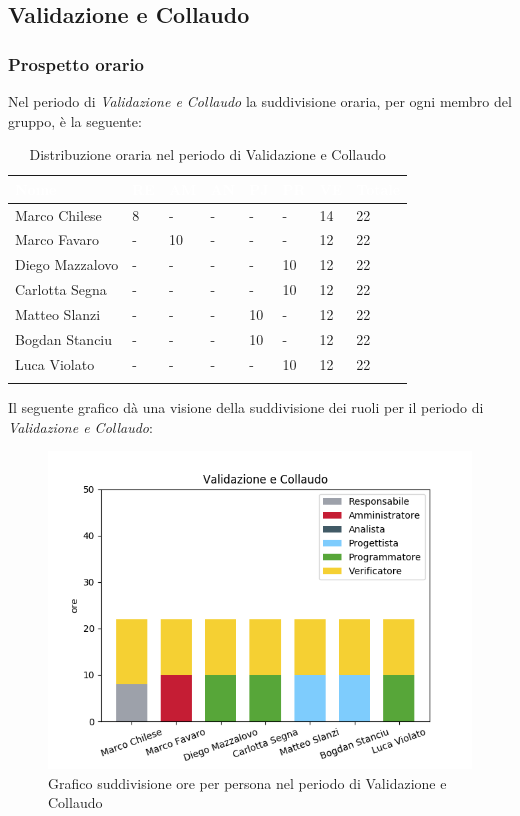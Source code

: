 \newpage
\subsection{Validazione e Collaudo}
\label{PVC}
\subsubsection{Prospetto orario}
Nel periodo di \textit{Validazione e Collaudo} la suddivisione oraria, per ogni membro del gruppo, è la seguente:

\begin{longtable}{|C{.30\textwidth}|C{.06\textwidth}|C{.06\textwidth}|C{.06\textwidth} | C{.06\textwidth}| C{.06\textwidth} | C{.06\textwidth} | C{.10\textwidth} |}
	\hline
{}	\textbf{\textcolor{white}{Nome}} & \textbf{\textcolor{white}{RE}} & \textbf{\textcolor{white}{AM}} & \textbf{\textcolor{white}{AN}} & \textbf{\textcolor{white}{PJ}} & \textbf{\textcolor{white}{PR}} & \textbf{\textcolor{white}{VE}} & \textbf{\textcolor{white}{Totale}}\\
	\hline 
	Marco Chilese & 8 & - & - & - & - & 14 & 22 \\
	\hline
	Marco Favaro &  - & 10 & - & - & - & 12 & 22 \\
	\hline
	Diego Mazzalovo & - & - & - & - & 10 & 12 & 22 \\
	\hline
	Carlotta Segna & - & - & - & - & 10 & 12 & 22 \\
	\hline
	Matteo Slanzi & - & - & - & 10 & - & 12 & 22 \\
	\hline
	Bogdan Stanciu & - & - & - & 10 & - & 12 & 22 \\
	\hline
	Luca Violato & - & - & - & - & 10 & 12 & 22 \\   
	\hline
	
	
	\caption{Distribuzione oraria nel periodo di Validazione e Collaudo}
	\label{Distribuzione oraria vc}
\end{longtable}

Il seguente grafico dà una visione della suddivisione dei ruoli per il periodo di \textit{Validazione e Collaudo}:

\begin{figure}[H]
	\centering
	\includegraphics[width=0.8\linewidth]{./images/fig_vc.png}
	\caption{Grafico suddivisione ore per persona nel periodo di Validazione e Collaudo}
	\label{fig:grafico suddivione ruoli periodo vc}
\end{figure}


